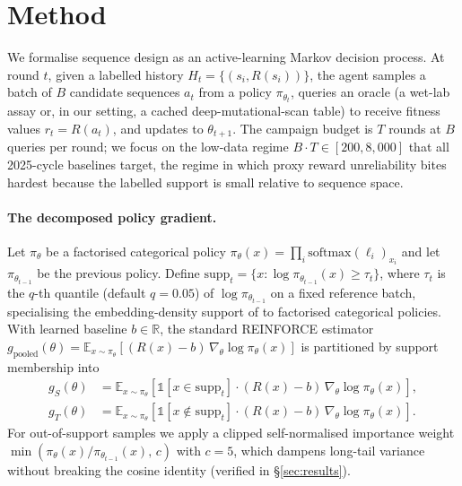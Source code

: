 \section{Method}
\label{sec:methods}

We formalise sequence design as an active-learning Markov decision process. At round $t$, given a labelled history $H_t = \{(s_i, R(s_i))\}$, the agent samples a batch of $B$ candidate sequences $a_t$ from a policy $\pi_{\theta_t}$, queries an oracle (a wet-lab assay or, in our setting, a cached deep-mutational-scan table) to receive fitness values $r_t = R(a_t)$, and updates to $\theta_{t+1}$. The campaign budget is $T$ rounds at $B$ queries per round; we focus on the low-data regime $B\cdot T\in[200, 8{,}000]$ that all 2025-cycle baselines target, the regime in which proxy reward unreliability bites hardest because the labelled support is small relative to sequence space.

\paragraph{The decomposed policy gradient.} Let $\pi_{\theta}$ be a factorised categorical policy $\pi_\theta(x)=\prod_i \mathrm{softmax}(\ell_i)_{x_i}$ and let $\pi_{\theta_{t-1}}$ be the previous policy. Define $\mathrm{supp}_t = \{ x : \log \pi_{\theta_{t-1}}(x) \geq \tau_t \}$, where $\tau_t$ is the $q$-th quantile (default $q=0.05$) of $\log \pi_{\theta_{t-1}}$ on a fixed reference batch, specialising the embedding-density support of \citet{kim2025deltacs} to factorised categorical policies. With learned baseline $b\in\mathbb{R}$, the standard REINFORCE estimator $g_{\mathrm{pooled}}(\theta) = \mathbb{E}_{x\sim\pi_\theta}[(R(x)-b)\,\nabla_\theta \log\pi_\theta(x)]$ is partitioned by support membership into
\begin{align}
g_S(\theta) &= \mathbb{E}_{x\sim\pi_\theta} \!\left[ \mathbb{1}[x\!\in\!\mathrm{supp}_t] \cdot (R(x)\!-\!b)\,\nabla_\theta \log\pi_\theta(x) \right], \\
g_T(\theta) &= \mathbb{E}_{x\sim\pi_\theta} \!\left[ \mathbb{1}[x\!\notin\!\mathrm{supp}_t] \cdot (R(x)\!-\!b)\,\nabla_\theta \log\pi_\theta(x) \right].
\end{align}
For out-of-support samples we apply a clipped self-normalised importance weight $\min(\pi_\theta(x)/\pi_{\theta_{t-1}}(x),\, c)$ with $c=5$, which dampens long-tail variance without breaking the cosine identity (verified in §\ref{sec:results}).

